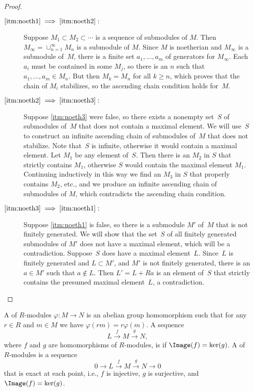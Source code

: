 \begin{proof}
  \hfill
  \begin{description}
    \item[$\ref{itm:noeth1} \implies \ref{itm:noeth2}:$]
      Suppose $M_1\subset M_2\subset \cdots$ is a
      sequence of submodules of $M$.  Then
      $M_\infty=\cup_{n=1}^{\infty} M_n$ is a submodule of $M$.
      Since $M$ is noetherian and $M_\infty$ is a submodule of~$M$,
      there is a finite set $a_1,\dots, a_m$ of
      generators for $M_{\infty}$.  Each $a_i$
      must be contained in some $M_j$, so there is an $n$ such that
      $a_1,\dots, a_m\in M_n$.  But then $M_{k}=M_n$ for all
      $k\geq n$, which proves that the chain of $M_i$ stabilizes,
      so the ascending chain condition holds for~$M$.

    \item[$\ref{itm:noeth2} \implies \ref{itm:noeth3}:$]
      Suppose \ref{itm:noeth3} were false, so there exists
      a nonempty set~$S$ of submodules of~$M$ that does not
      contain a maximal element.  We will use~$S$ to construct
      an infinite ascending chain of submodules of~$M$ that
      does not stabilize. Note that~$S$ is infinite, otherwise
      it would contain a maximal element.  Let $M_1$ be
      any element of~$S$.  Then there is an $M_2$ in $S$ that
      strictly contains $M_1$, otherwise $S$ would contain the maximal
      element $M_1$. Continuing inductively in this way we find
      an $M_3$ in $S$ that properly contains $M_2$, etc., and we
      produce an infinite ascending chain of submodules of $M$,
      which contradicts the ascending chain condition.

    \item[$\ref{itm:noeth3} \implies \ref{itm:noeth1}:$]
      Suppose \ref{itm:noeth1} is false,
      so there is a submodule $M'$ of~$M$ that
      is not finitely generated.  We will show that the set~$S$ of
      all finitely generated submodules of $M'$ does not
      have a maximal element, which will be a contradiction.
      Suppose~$S$ does have a maximal element~$L$.  Since~$L$
      is finitely generated and $L\subset M'$, and $M'$ is not
      finitely generated, there is an $a\in M'$ such that
      $a\not\in L$.  Then $L'=L+Ra$ is an element of~$S$ that
      strictly contains the presumed maximal element~$L$,
      a contradiction.
  \end{description}
\end{proof}

\begin{definition}
  A  of $R$-modules $\varphi:M\to N$ is an abelian
  group homomorphism such that for any $r\in R$ and $m\in M$ we have
  $\varphi(rm) = r\varphi(m)$. A sequence
  \[
    L \xrightarrow{f} M \xrightarrow{g} N,
  \]
  where $f$ and $g$ are homomorphisms of $R$-modules, is 
  if $\Image(f)=\ker(g)$. A  of $R$-modules
  is a sequence
  \[
    0 \to L \xrightarrow{f} M \xrightarrow{g} N \to 0
  \]
  that is exact at each point, i.e., $f$ is injective, $g$ is surjective,
  and $\Image(f) = \ker(g)$.
\end{definition}

